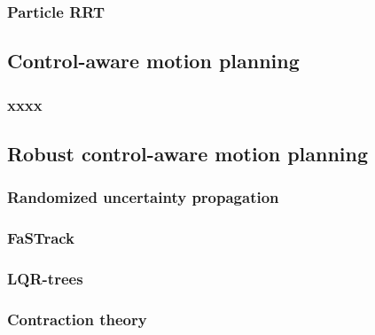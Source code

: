 \subsubsection{Particle RRT}
\subsection{Control-aware motion planning}
\subsubsection{xxxx}
\subsection{Robust control-aware motion planning}
\subsubsection{Randomized uncertainty propagation}
\subsubsection{FaSTrack}
\subsubsection{LQR-trees}
\subsubsection{Contraction theory}

\todomarker{}